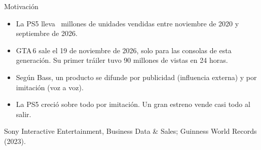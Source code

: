 \documentclass[aspectratio=169,11pt,notes=only]{beamer}
\newcommand{\fuente}[1]{\par\vfill{\fontsize{6}{7}\selectfont\color{tenue}#1}\par\vskip1mm}
\begin{document}
\begin{frame}{Motivación}
  \vskip3mm
  \begin{itemize}\setlength{\itemsep}{2.5mm}
    \item La PS5 lleva \cifraPsUnidadesFin\ millones de unidades vendidas entre noviembre de 2020 y septiembre de 2026.
    \item GTA\,6 sale el 19 de noviembre de 2026, solo para las consolas de esta generación. Su primer tráiler tuvo 90 millones de vistas en 24 horas.
    \item Según Bass, un producto se difunde por publicidad (influencia externa) y por imitación (voz a voz).
    \item La PS5 creció sobre todo por imitación. Un gran estreno vende casi todo al salir.
  \end{itemize}
  \fuente{Sony Interactive Entertainment, Business Data \& Sales; Guinness World Records (2023).}
\end{frame}
\end{document}
